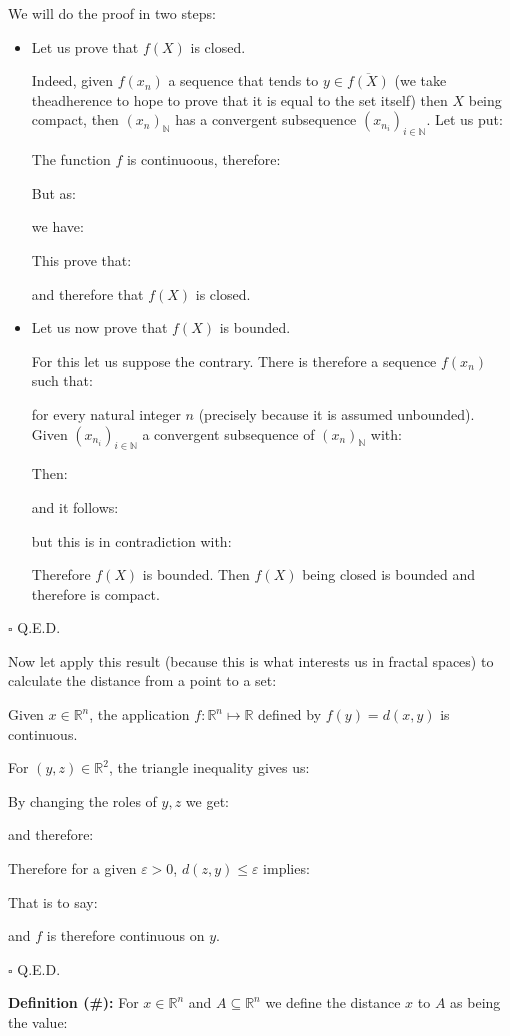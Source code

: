 	\begin{dem}
	We will do the proof in two steps:
	\begin{itemize}
		\item Let us prove that $f(X)$ is closed.

		Indeed, given $f(x_n)$ a sequence that tends to $y\in \overline{f(X)}$ (we take theadherence to hope to prove that it is equal to the set itself) then $X$ being compact, then $(x_n)_\mathbb{N}$ has a convergent subsequence $(x_{n_i})_{i\in \mathbb{N}}$.
		Let us put:
		
		The function $f$ is continuoous, therefore:
		
		But as:
		
		we have:
		
		This prove that:
		
		and therefore that $f(X)$ is closed.
	
	\item Let us now prove that $f (X)$ is bounded.

		For this let us suppose the contrary. There is therefore a sequence $f(x_n)$ such that:
		
		for every natural integer $n$ (precisely because it is assumed unbounded). Given $(x_{n_i})_{i\in \mathbb{N}}$ a convergent subsequence of $(x_n)_\mathbb{N}$ with:
		
		Then:
		
		and it follows:
		
		but this is in contradiction with:
		
		Therefore $f(X)$ is bounded. Then $f(X)$ being closed is bounded and therefore is compact.
	\end{itemize}
	\begin{flushright}
		$\square$  Q.E.D.
	\end{flushright}
	\end{dem}
		Now let apply this result (because this is what interests us in fractal spaces) to calculate the distance from a point to a set:
	\begin{theorem}
	Given $x\in \mathbb{R}^n$, the application $f:\mathbb{R}^n \mapsto \mathbb{R}$ defined by $f (y) = d (x, y)$ is continuous.
	\end{theorem}
	\begin{dem}
	For $(y,z)\in\mathbb{R}^2$, the triangle inequality gives us:
	
	By changing the roles of $y, z$ we get:
	
	and therefore:
	
	Therefore for a given $\varepsilon >0$, $d(z,y)\leq \varepsilon$ implies:
	
	That is to say:
	
	and $f$ is therefore continuous on $y$.
	\begin{flushright}
		$\square$  Q.E.D.
	\end{flushright}
	\end{dem}
	\textbf{Definition (\#\mydef):} For $x\in \mathbb{R}^n$ and $A\subseteq \mathbb{R}^n$ we define the distance $x$ to $A$ as being the value:
	
